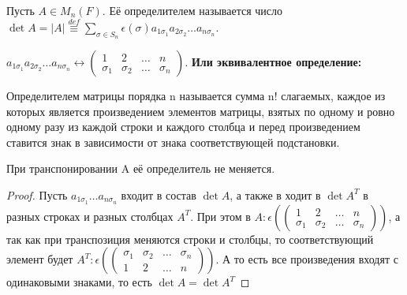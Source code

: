  \begin{definition}
 	Пусть \(A\in M_n(F)\). Её определителем называется число \(\det A = |A| \overset{def}{\equiv}\sum_{\sigma\in S_n}\epsilon(\sigma)a_{1\sigma_1}a_{2\sigma_2}\ldots a_{n\sigma_n}\). 
	
	\(a_{1\sigma_1}a_{2\sigma_2}\ldots a_{n\sigma_n}\longleftrightarrow \begin{pmatrix}
 	1 & 2 & \ldots & n \\
 	\sigma_1 & \sigma_2 &\ldots  &\sigma_n
 	\end{pmatrix}\).\newline
 	\textbf{Или эквивалентное определение:} 
	
	Определителем матрицы порядка n называется сумма n! слагаемых, каждое из которых является произведением элементов матрицы, 
	взятых по одному и ровно одному разу из каждой строки и каждого столбца и перед произведением ставится знак в зависимости 
	от знака соответствующей подстановки. 
 \end{definition}
 \begin{proposition}
 	При транспонировании A её определитель не меняется.
 \end{proposition}
 \begin{proof}
 	Пусть \(a_{1\sigma_1}\ldots a_{n\sigma_n}\) входит в состав \(\det A\), а также в ходит в \(\det A^T\) в разных строках и разных столбцах \(A^T\). При этом в \(A: \epsilon(\begin{pmatrix}
 		1 & 2 & \ldots & n \\
 		\sigma_1 & \sigma_2 & \ldots & \sigma_n
 	\end{pmatrix})\), а так как при транспозиция меняются строки и столбцы, то соответствующий элемент будет \(A^T: \epsilon(\begin{pmatrix}
 	\sigma_1 & \sigma_2 & \ldots & \sigma_n \\
 	1 & 2 & \ldots & n 
 	\end{pmatrix})\). А то есть все произведения входят с одинаковыми знаками, то есть \(\det A = \det A^T\)
 \end{proof}

 
